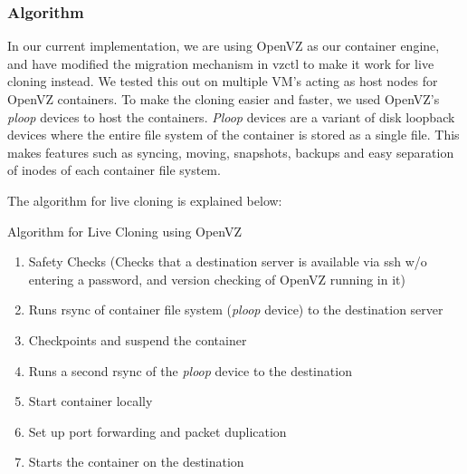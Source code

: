 

\subsubsection{Algorithm}


In our current implementation, we are using OpenVZ\cite{openvz} as our container engine, and have modified the migration mechanism in vzctl \cite{vzctl} to make it work for live cloning instead. 
We tested this out on multiple VM's acting as host nodes for OpenVZ containers. 
To make the cloning easier and faster, we used OpenVZ's \textit{ploop} devices \cite{ploop} to host the containers. 
\textit{Ploop} devices are a variant of disk loopback devices where the entire file system of the container is stored as a single file. 
This makes features such as syncing, moving, snapshots, backups and easy separation of inodes of each container file system.

The algorithm for live cloning is explained below: 

\begin{algorithm}[h]
  \caption{Algorithm for Live Cloning using OpenVZ} 
  \label{algCloning}
    \begin{enumerate}
    \item Safety Checks (Checks that a destination server is available via ssh w/o entering a password, and version checking of OpenVZ running in it) 
    \item Runs rsync of container file system (\textit{ploop} device) to the destination server  
    \item Checkpoints and suspend the container 
    \item Runs a second rsync of the \textit{ploop} device to the destination  
    \item Start container locally 
    \item Set up port forwarding and packet duplication
   \item Starts the container on the destination 
   \end{enumerate}

\end{algorithm}

